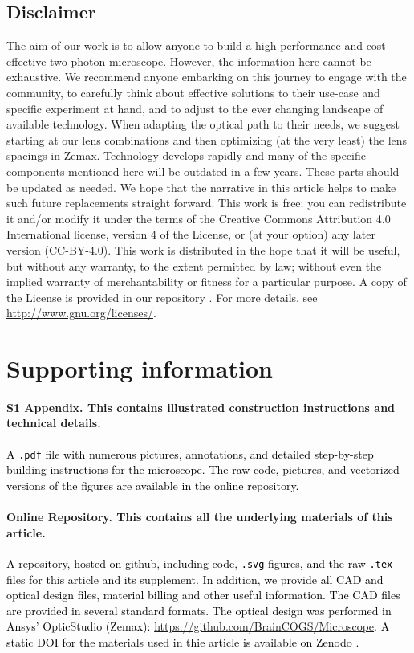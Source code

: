\documentclass[10pt,letterpaper]{article}
\begin{document}
\subsection*{Disclaimer}
The aim of our work is to allow anyone to build a high-performance and cost-effective two-photon microscope. However, the information here cannot be exhaustive. We recommend anyone embarking on this journey to engage with the community, to carefully think about effective solutions to their use-case and specific experiment at hand, and to adjust to the ever changing landscape of available technology. When adapting the optical path to their needs, we suggest starting at our lens combinations and then optimizing (at the very least) the lens spacings in Zemax. Technology develops rapidly and many of the specific components mentioned here will be outdated in a few years. These parts should be updated as needed. We hope that the narrative in this article helps to make such future replacements straight forward.\newline
This work is free: you can redistribute it and/or modify it under the terms of the Creative Commons Attribution 4.0 International license, version 4 of the License, or (at your option) any later version (CC-BY-4.0). This work is distributed in the hope that it will be useful, but without any warranty, to the extent permitted by law; without even the implied warranty of merchantability or fitness for a particular purpose. A copy of the License is provided in our repository \cite{Zenodo2024}. For more details, see \url{http://www.gnu.org/licenses/}.

\section*{Supporting information}

\paragraph*{S1 Appendix. This contains illustrated construction instructions and technical details.}
\label{S1_Appendix}
\textcolor{black}{A \texttt{.pdf} file with numerous pictures, annotations, and detailed step-by-step building instructions for the microscope. The raw code, pictures, and vectorized versions of the figures are available in the online repository.}

\paragraph*{Online Repository. This contains all the underlying materials of this article.}
\label{repository}
\textcolor{black}{A repository, hosted on github, including code, \texttt{.svg} figures, and the raw \texttt{.tex} files for this article and its supplement. In addition, we provide all CAD and optical design files, material billing and other useful information. The CAD files are provided in several standard formats. The optical design was performed in Ansys' OpticStudio (Zemax): \url{https://github.com/BrainCOGS/Microscope}. A static DOI for the materials used in thie article is available on Zenodo \cite{Zenodo2024}.}
\end{document}
